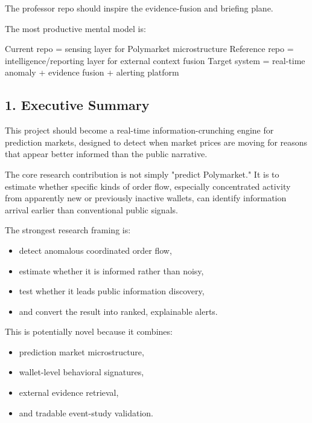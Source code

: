 \documentclass[
]{article}
\newenvironment{Shaded}{}{}
\newcommand{\NormalTok}[1]{#1}
\providecommand{\tightlist}{%
  \setlength{\itemsep}{0pt}\setlength{\parskip}{0pt}}
\begin{document}
The professor repo should inspire the evidence-fusion and briefing
plane.

The most productive mental model is:

\begin{Shaded}
\begin{Highlighting}[]
\NormalTok{Current repo = sensing layer for Polymarket microstructure}
\NormalTok{Reference repo = intelligence/reporting layer for external context fusion}
\NormalTok{Target system = real{-}time anomaly + evidence fusion + alerting platform}
\end{Highlighting}
\end{Shaded}

\subsection{1. Executive Summary}\label{1-executive-summary}

This project should become a real-time information-crunching engine for
prediction markets, designed to detect when market prices are moving for
reasons that appear better informed than the public narrative.

The core research contribution is not simply "predict Polymarket." It is
to estimate whether specific kinds of order flow, especially
concentrated activity from apparently new or previously inactive
wallets, can identify information arrival earlier than conventional
public signals.

The strongest research framing is:

\begin{itemize}
\tightlist
\item
  detect anomalous coordinated order flow,
\item
  estimate whether it is informed rather than noisy,
\item
  test whether it leads public information discovery,
\item
  and convert the result into ranked, explainable alerts.
\end{itemize}

This is potentially novel because it combines:

\begin{itemize}
\tightlist
\item
  prediction market microstructure,
\item
  wallet-level behavioral signatures,
\item
  external evidence retrieval,
\item
  and tradable event-study validation.
\end{itemize}
\end{document}
